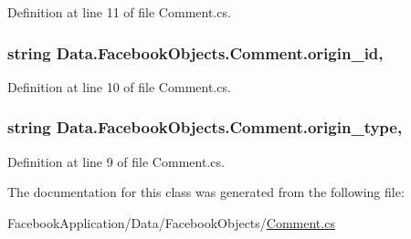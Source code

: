 Definition at line 11 of file Comment.\+cs.

\subsubsection[{\texorpdfstring{origin\+\_\+id}{origin_id}}]{\setlength{\rightskip}{0pt plus 5cm}string Data.\+Facebook\+Objects.\+Comment.\+origin\+\_\+id\hspace{0.3cm}{\ttfamily [get]}, {\ttfamily [set]}}\hypertarget{class_data_1_1_facebook_objects_1_1_comment_aa13d3076050de21b8637566bc1e7b8b1}{}\label{class_data_1_1_facebook_objects_1_1_comment_aa13d3076050de21b8637566bc1e7b8b1}


Definition at line 10 of file Comment.\+cs.

\subsubsection[{\texorpdfstring{origin\+\_\+type}{origin_type}}]{\setlength{\rightskip}{0pt plus 5cm}string Data.\+Facebook\+Objects.\+Comment.\+origin\+\_\+type\hspace{0.3cm}{\ttfamily [get]}, {\ttfamily [set]}}\hypertarget{class_data_1_1_facebook_objects_1_1_comment_a7dc02ae737535044e97e841357bc40a6}{}\label{class_data_1_1_facebook_objects_1_1_comment_a7dc02ae737535044e97e841357bc40a6}


Definition at line 9 of file Comment.\+cs.



The documentation for this class was generated from the following file\+:\begin{DoxyCompactItemize}
\item 
Facebook\+Application/\+Data/\+Facebook\+Objects/\hyperlink{_comment_8cs}{Comment.\+cs}\end{DoxyCompactItemize}
